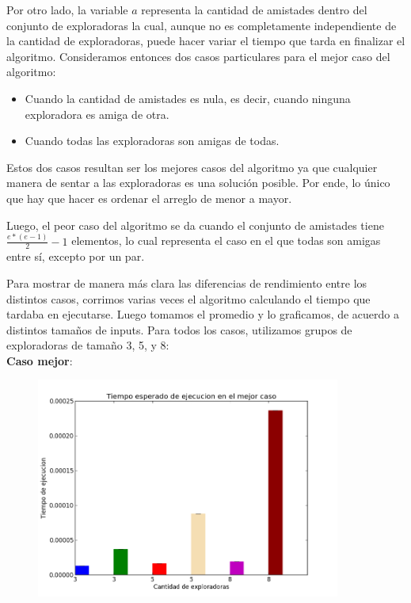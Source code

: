 \documentclass[11pt]{article}
\begin{document}
Por otro lado, la variable $a$ representa la cantidad de amistades dentro del conjunto de exploradoras la cual, 
aunque no es completamente independiente de la cantidad de exploradoras, puede hacer variar el tiempo que tarda 
en finalizar el algoritmo. Consideramos entonces dos casos particulares para el mejor caso del algoritmo:
\begin{itemize}
  \item Cuando la cantidad de amistades es nula, es decir, cuando ninguna exploradora es amiga de otra.
  \item Cuando todas las exploradoras son amigas de todas.
\end{itemize}
Estos dos casos resultan ser los mejores casos del algoritmo ya que cualquier manera de sentar a las exploradoras 
es una solución posible. Por ende, lo único que hay que hacer es ordenar el arreglo de menor a mayor. 

Luego, el peor caso del algoritmo se da cuando el conjunto de amistades tiene $\frac{e*(e-1)}{2} - 1$ elementos, 
lo cual representa el caso en el que todas son amigas entre sí, excepto por un par.

Para mostrar de manera más clara las diferencias de rendimiento entre los distintos casos, corrimos varias veces 
el algoritmo calculando el tiempo que tardaba en ejecutarse. Luego tomamos el promedio y lo graficamos, de acuerdo a distintos tamaños de inputs.
Para todos los casos, utilizamos grupos de exploradoras de tamaño 3, 5, y 8: \\

\textbf{Caso mejor}:

      \begin{figure}[h]
        \begin{center}
        \includegraphics[width=100mm,scale=0.5]{mejorCaso}
        \end{center}
        \end{figure}
\end{document}
